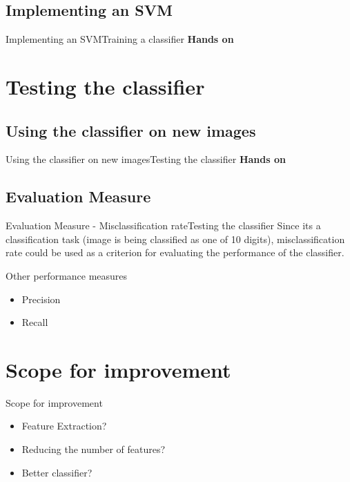 \documentclass{beamer}
\begin{document}
\subsection{Implementing an SVM}
\begin{frame}{Implementing an SVM}{Training a classifier}
    \centering
       \textbf{Hands on}\\
\end{frame}

\section{Testing the classifier}
\subsection{Using the classifier on new images}
\begin{frame}{Using the classifier on new images}{Testing the classifier}
    \centering
        \textbf{Hands on}\\
\end{frame}

\subsection{Evaluation Measure}
\begin{frame}{Evaluation Measure - Misclassification rate}{Testing the classifier}
    Since its a classification task (image is being classified as one of 10 digits), 
    misclassification rate could be used as a criterion for evaluating the performance of
    the classifier.
   
    \begin{block}{Other performance measures}
    \begin{itemize}
    \item Precision
    \item Recall
    
    \end{itemize}
    \end{block}

\end{frame}

\section{Scope for improvement}
\begin{frame}{Scope for improvement}
\begin{itemize}
\item Feature Extraction?
\pause
\item Reducing the number of features?
\pause
\item Better classifier?
\end{itemize}

\end{frame}
\end{document}
